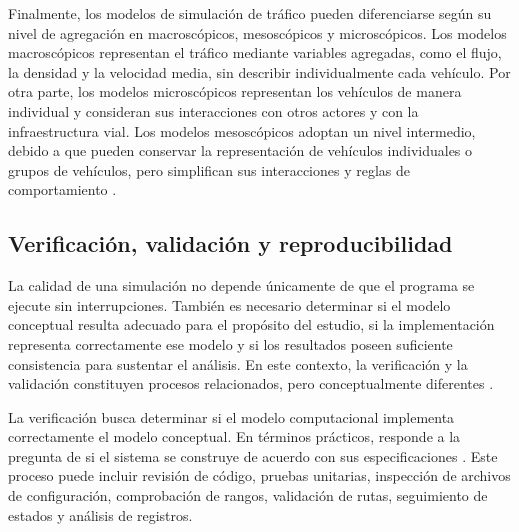 Finalmente, los modelos de simulación de tráfico pueden diferenciarse según su nivel de agregación en macroscópicos, mesoscópicos y microscópicos. Los modelos macroscópicos representan el tráfico mediante variables agregadas, como el flujo, la densidad y la velocidad media, sin describir individualmente cada vehículo. Por otra parte, los modelos microscópicos representan los vehículos de manera individual y consideran sus interacciones con otros actores y con la infraestructura vial. Los modelos mesoscópicos adoptan un nivel intermedio, debido a que pueden conservar la representación de vehículos individuales o grupos de vehículos, pero simplifican sus interacciones y reglas de comportamiento \cite{burghout2004hybrid}. 


\subsection{Verificación, validación y reproducibilidad}
\label{subsubsec:verificacion_validacion_reproducibilidad}

La calidad de una simulación no depende únicamente de que el programa se ejecute sin interrupciones. También es necesario determinar si el modelo conceptual resulta adecuado para el propósito del estudio, si la implementación representa correctamente ese modelo y si los resultados poseen suficiente consistencia para sustentar el análisis. En este contexto, la verificación y la validación constituyen procesos relacionados, pero conceptualmente diferentes \cite{sargent2003verification}. 

La verificación busca determinar si el modelo computacional implementa correctamente el modelo conceptual. En términos prácticos, responde a la pregunta de si el sistema se construye de acuerdo con sus especificaciones \cite{sargent2003verification}. Este proceso puede incluir revisión de código, pruebas unitarias, inspección de archivos de configuración, comprobación de rangos, validación de rutas, seguimiento de estados y análisis de registros. 

